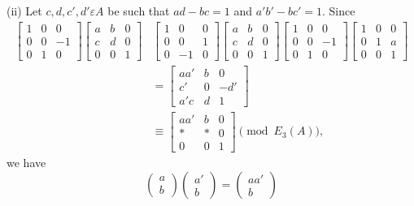 (ii) Let $c,d,c',d'\varepsilon A$ be such that $ad-bc=1$ and
$a'b'-bc'=1$. Since
$$
\begin{aligned}
\begin{bmatrix}
1 & 0 & 0\\
0 & 0 & -1\\
0 & 1 & 0
\end{bmatrix} \begin{bmatrix}
a & b & 0\\
c & d & 0\\
0 & 0 & 1
\end{bmatrix}& \begin{bmatrix}
1 & 0 & 0\\
0 & 0 & 1\\
0 & -1 & 0
\end{bmatrix} \begin{bmatrix}
a & b & 0\\
c & d & 0\\
0 & 0 & 1
\end{bmatrix} \begin{bmatrix}
1 & 0 & 0\\
0 & 0 & -1\\
0 & 1 & 0
\end{bmatrix} \begin{bmatrix}
1 & 0 & 0\\
0 & 1 & a\\
0 & 0 & 1
\end{bmatrix}\\
&{}=\begin{bmatrix}
aa' & b & 0\\
c' & 0 &-d'\\
a'c & d & 1
\end{bmatrix}\\ &\equiv{}\begin{bmatrix}
aa' & b & 0\\
\ast & \ast & 0\\
0 & 0 & 1
\end{bmatrix} \pmod{E_3(A)},
\end{aligned}
$$
we have
$$
\begin{pmatrix}
a\\
b
\end{pmatrix} \begin{pmatrix}
a'\\
b
\end{pmatrix} = \begin{pmatrix}
aa'\\
b
\end{pmatrix}
$$

